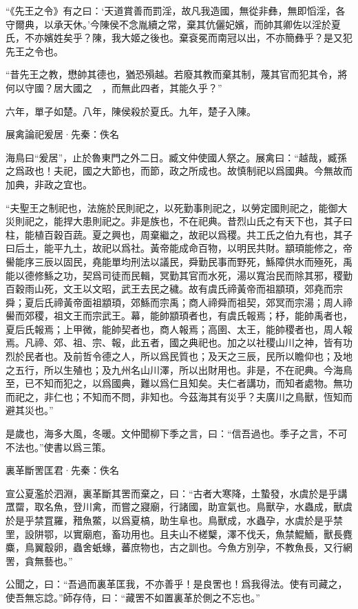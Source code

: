 \documentclass[12pt,a4paper]{ctexbook}
\begin{document}
“《先王之令》有之曰：‘天道賞善而罰淫，故凡我造國，無從非彝，無即慆淫，各守爾典，以承天休。’今陳侯不念胤續之常，棄其伉儷妃嬪，而帥其卿佐以淫於夏氏，不亦嬪姓矣乎？陳，我大姬之後也。棄袞冕而南冠以出，不亦簡彝乎？是又犯先王之令也。\par
“昔先王之教，懋帥其德也，猶恐殞越。若廢其教而棄其制，蔑其官而犯其令，將何以守國？居大國之　，而無此四者，其能久乎？”\par
六年，單子如楚。八年，陳侯殺於夏氏。九年，楚子入陳。\par
展禽論祀爰居·先秦：佚名 \par
海鳥曰“爰居”，止於魯東門之外二日。臧文仲使國人祭之。展禽曰：“越哉，臧孫之爲政也！夫祀，國之大節也，而節，政之所成也。故慎制祀以爲國典。今無故而加典，非政之宜也。\par
“夫聖王之制祀也，法施於民則祀之，以死勤事則祀之，以勞定國則祀之，能御大災則祀之，能捍大患則祀之。非是族也，不在祀典。昔烈山氏之有天下也，其子曰柱，能植百穀百蔬。夏之興也，周棄繼之，故祀以爲稷。共工氏之伯九有也，其子曰后土，能平九土，故祀以爲社。黃帝能成命百物，以明民共財。顓頊能修之，帝嚳能序三辰以固民，堯能單均刑法以議民，舜勤民事而野死，鯀障供水而殛死，禹能以德修鯀之功，契爲司徒而民輯，冥勤其官而水死，湯以寬治民而除其邪，稷勤百穀雨山死，文王以文昭，武王去民之穢。故有虞氏禘黃帝而祖顓頊，郊堯而宗舜；夏后氏禘黃帝面祖顓頊，郊鯀而宗禹；商人禘舜而祖契，郊冥而宗湯；周人禘嚳而郊稷，祖文王而宗武王。幕，能帥顓頊者也，有虞氏報焉；杼，能帥禹者也，夏后氏報焉；上甲微，能帥契者也，商人報焉；高圉、太王，能帥稷者也，周人報焉。凡禘、郊、祖、宗、報，此五者，國之典祀也。加之以社稷山川之神，皆有功烈於民者也。及前哲令德之人，所以爲民質也；及天之三辰，民所以瞻仰也；及地之五行，所以生殖也；及九州名山川澤，所以出財用也。非是，不在祀典。今海鳥至，已不知而犯之，以爲國典，難以爲仁且知矣。夫仁者講功，而知者處物。無功而祀之，非仁也；不知而不問，非知也。今茲海其有災乎？夫廣川之鳥獸，恆知而避其災也。”\par
是歲也，海多大風，冬暖。文仲聞柳下季之言，曰：“信吾過也。季子之言，不可不法也。”使書以爲三策。\par
裏革斷罟匡君·先秦：佚名 \par
宣公夏濫於泗淵，裏革斷其罟而棄之，曰：“古者大寒降，土蟄發，水虞於是乎講罛罶，取名魚，登川禽，而嘗之寢廟，行諸國，助宣氣也。鳥獸孕，水蟲成，獸虞於是乎禁罝羅，矠魚鱉，以爲夏槁，助生阜也。鳥獸成，水蟲孕，水虞於是乎禁罜，設阱鄂，以實廟庖，畜功用也。且夫山不槎櫱，澤不伐夭，魚禁鯤鮞，獸長麑麋，鳥翼鷇卵，蟲舍蚔蝝，蕃庶物也，古之訓也。今魚方別孕，不教魚長，又行網罟，貪無藝也。”\par
公聞之，曰：“吾過而裏革匡我，不亦善乎！是良罟也！爲我得法。使有司藏之，使吾無忘諗。”師存侍，曰：“藏罟不如置裏革於側之不忘也。”\par
\end{document}
